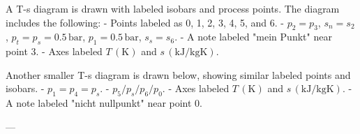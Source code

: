 A T-s diagram is drawn with labeled isobars and process points. The diagram includes the following:  
- Points labeled as 0, 1, 2, 3, 4, 5, and 6.  
- \( p_2 = p_3 \), \( s_n = s_2 \), \( p_t = p_s = 0.5 \, \text{bar} \), \( p_1 = 0.5 \, \text{bar} \), \( s_s = s_6 \).  
- A note labeled "mein Punkt" near point 3.  
- Axes labeled \( T \, (\text{K}) \) and \( s \, (\text{kJ/kgK}) \).  

Another smaller T-s diagram is drawn below, showing similar labeled points and isobars.  
- \( p_1 = p_4 = p_s \).  
- \( p_5/p_s/p_6/p_0 \).  
- Axes labeled \( T \, (\text{K}) \) and \( s \, (\text{kJ/kgK}) \).  
- A note labeled "nicht nullpunkt" near point 0.  

---